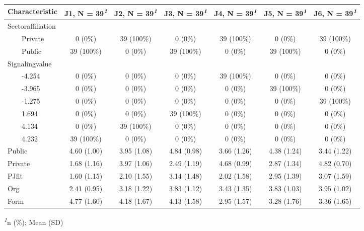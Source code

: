 \setlength{\LTpost}{0mm}
\begin{longtable}{lcccccc}
\toprule
\textbf{Characteristic} & \textbf{J1}, N = 39\textsuperscript{\textit{1}} & \textbf{J2}, N = 39\textsuperscript{\textit{1}} & \textbf{J3}, N = 39\textsuperscript{\textit{1}} & \textbf{J4}, N = 39\textsuperscript{\textit{1}} & \textbf{J5}, N = 39\textsuperscript{\textit{1}} & \textbf{J6}, N = 39\textsuperscript{\textit{1}} \\ 
\midrule\addlinespace[2.5pt]
Sectoraffiliation &  &  &  &  &  &  \\ 
    Private & 0 (0\%) & 39 (100\%) & 0 (0\%) & 39 (100\%) & 0 (0\%) & 39 (100\%) \\ 
    Public & 39 (100\%) & 0 (0\%) & 39 (100\%) & 0 (0\%) & 39 (100\%) & 0 (0\%) \\ 
Signalingvalue &  &  &  &  &  &  \\ 
    -4.254 & 0 (0\%) & 0 (0\%) & 0 (0\%) & 39 (100\%) & 0 (0\%) & 0 (0\%) \\ 
    -3.965 & 0 (0\%) & 0 (0\%) & 0 (0\%) & 0 (0\%) & 39 (100\%) & 0 (0\%) \\ 
    -1.275 & 0 (0\%) & 0 (0\%) & 0 (0\%) & 0 (0\%) & 0 (0\%) & 39 (100\%) \\ 
    1.694 & 0 (0\%) & 0 (0\%) & 39 (100\%) & 0 (0\%) & 0 (0\%) & 0 (0\%) \\ 
    4.134 & 0 (0\%) & 39 (100\%) & 0 (0\%) & 0 (0\%) & 0 (0\%) & 0 (0\%) \\ 
    4.232 & 39 (100\%) & 0 (0\%) & 0 (0\%) & 0 (0\%) & 0 (0\%) & 0 (0\%) \\ 
Public & 4.60 (1.00) & 3.95 (1.08) & 4.84 (0.98) & 3.66 (1.26) & 4.38 (1.24) & 3.44 (1.22) \\ 
Private & 1.68 (1.16) & 3.97 (1.06) & 2.49 (1.19) & 4.68 (0.99) & 2.87 (1.34) & 4.82 (0.70) \\ 
PJfit & 1.60 (1.15) & 2.10 (1.55) & 3.14 (1.48) & 2.02 (1.58) & 2.95 (1.39) & 3.07 (1.59) \\ 
Org & 2.41 (0.95) & 3.18 (1.22) & 3.83 (1.12) & 3.43 (1.35) & 3.83 (1.03) & 3.95 (1.02) \\ 
Form & 4.77 (1.60) & 4.18 (1.67) & 4.13 (1.58) & 2.95 (1.57) & 3.28 (1.76) & 3.36 (1.65) \\ 
\bottomrule
\end{longtable}
\begin{minipage}{\linewidth}
\textsuperscript{\textit{1}}n (\%); Mean (SD)\\
\end{minipage}

